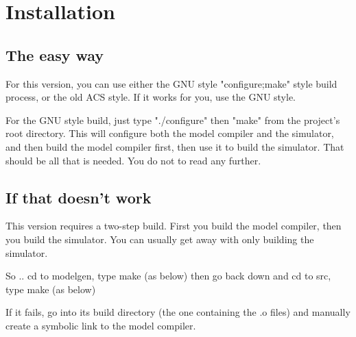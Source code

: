 %
%
%
%
\chapter{Installation}

\section{The easy way}

For this version, you can use either the GNU style "configure;make"
style build process, or the old ACS style.  If it works for you, use
the GNU style.

For the GNU style build, just type "./configure" then "make" from the
project's root directory.  This will configure both the model compiler
and the simulator, and then build the model compiler first, then use
it to build the simulator.  That should be all that is needed.  You do
not to read any further.

\section{If that doesn't work}

This version requires a two-step build.  First you build the model
compiler, then you build the simulator.  You can usually get away with
only building the simulator.

So ..
cd to modelgen, type make (as below)
then go back down and cd to src, type make (as below)

If it fails, go into its build directory (the one containing the .o
files) and manually create a symbolic link to the model compiler.


